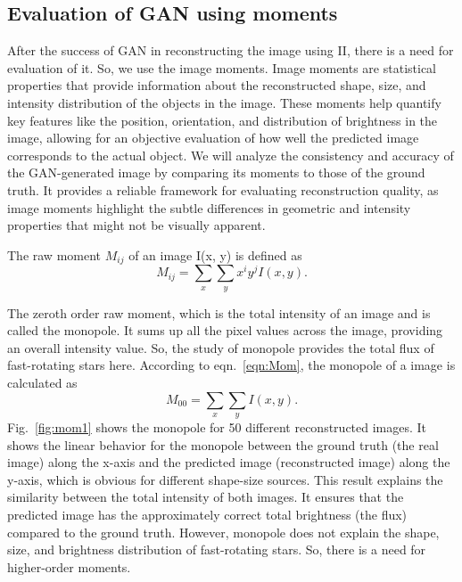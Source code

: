 \subsection{Evaluation of GAN using moments}
After the success of GAN in reconstructing the image using II, there is a need for evaluation of it. So, we use the image moments. Image moments are statistical properties that provide information about the reconstructed shape, size, and intensity distribution of the objects in the image. These moments help quantify key features like the position, orientation, and distribution of brightness in the image, allowing for an objective evaluation of how well the predicted image corresponds to the actual object. We will analyze the consistency and accuracy of the GAN-generated image by comparing its moments to those of the ground truth. It provides a reliable framework for evaluating reconstruction quality, as image moments highlight the subtle differences in geometric and intensity properties that might not be visually apparent. 

The raw moment $M_{ij}$ of an image I(x, y) is defined as \citep{hu1962visual}
\begin{equation}
	M_{ij} = \sum_{x} \sum_{y} x^i y^j I(x, y).
	\label{eqn:Mom}
\end{equation}

The zeroth order raw moment, which is the total intensity of an image and is called the monopole. It sums up all the pixel values across the image, providing an overall intensity value. So, the study of monopole provides the total flux of fast-rotating stars here. According to eqn.~\ref{eqn:Mom}, the monopole of a image is calculated as 
\begin{equation}
	M_{00} = \sum_{x} \sum_{y} I(x, y).
\end{equation}
Fig.~\ref{fig:mom1} shows the monopole for 50 different reconstructed images. It shows the linear behavior for the monopole between the ground truth (the real image) along the x-axis and the predicted image (reconstructed image) along the y-axis, which is obvious for different shape-size sources. This result explains the similarity between the total intensity of both images. It ensures that the predicted image has the approximately correct total brightness (the flux) compared to the ground truth. However, monopole does not explain the shape, size, and brightness distribution of fast-rotating stars. So, there is a need for higher-order moments.

